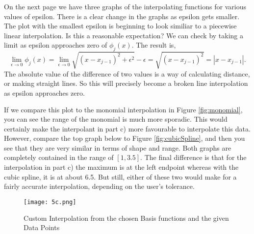 \documentclass{article}
\begin{document}
\begin{enumerate}[label = {\arabic*}]
\begin{enumerate}
			
			
			\hspace{15pt} On the next page we have three graphs of the interpolating functions for various values of epsilon. There is a clear change in the graphs as epsilon gets smaller. The plot with the smallest epsilon is beginning to look similiar to a piecewise linear interpolation. Is this a reasonable expectation? We can check by taking a limit as epsilon approaches zero of $\phi_j(x).$ The result is, \[\lim\limits_{\epsilon \rightarrow 0}\phi_j(x) = \lim\limits_{\epsilon \rightarrow 0} \sqrt{(x - x_{j - 1})^2 + \epsilon^2} - \epsilon = \sqrt{(x - x_{j - 1})^2} = |x - x_{j - 1}|.\] The absolute value of the difference of two values is a way of calculating distance, or making straight lines. So this will precisely become a broken line interpolation as epsilon approaches zero. 
			
			\hspace{15pt} If we compare this plot to the monomial interpolation in Figure \ref{fig:monomial}, you can see the range of the monomial is much more sporadic. This would certainly make the interpolant in part c) more favourable to interpolate this data. However, compare the top graph below to Figure \ref{fig:cubicSpline}, and then you see that they are very similar in terms of shape and range. Both graphs are completely contained in the range of $[1, 3.5]$. The final difference is that for the interpolation in part c) the maximum is at the left endpoint whereas with the cubic spline, it is at about 6.5. But still, either of these two would make for a fairly accurate interpolation, depending on the user's tolerance.
			
			\pagebreak
			
			\begin{figure}[h!]
				\centering
				\caption{Custom Interpolation from the chosen Basis functions and the given Data Points}
				\texttt{[image: 5c.png]}
			\end{figure}
		\end{enumerate}
	\end{enumerate}
\end{document}
